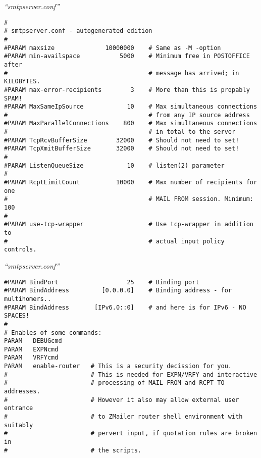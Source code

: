 \documentclass[a4paper,landscape]{slides}
\begin{document}


\begin{overlay}
\small
\centerline{{\it ``smtpserver.conf''}}
\tiny

\begin{verbatim}
#
# smtpserver.conf - autogenerated edition
#
#PARAM maxsize              10000000    # Same as -M -option
#PARAM min-availspace           5000    # Minimum free in POSTOFFICE after
#                                       # message has arrived; in KILOBYTES.
#PARAM max-error-recipients        3    # More than this is propably SPAM!
#PARAM MaxSameIpSource            10    # Max simultaneous connections
#                                       # from any IP source address
#PARAM MaxParallelConnections    800    # Max simultaneous connections
#                                       # in total to the server
#PARAM TcpRcvBufferSize        32000    # Should not need to set!
#PARAM TcpXmitBufferSize       32000    # Should not need to set!
#
#PARAM ListenQueueSize            10    # listen(2) parameter
#
#PARAM RcptLimitCount          10000    # Max number of recipients for one
#                                       # MAIL FROM session. Minimum: 100
#
#PARAM use-tcp-wrapper                  # Use tcp-wrapper in addition to
#                                       # actual input policy controls.
\end{verbatim}
\end{overlay}
\begin{overlay}
\small
\centerline{{\it ``smtpserver.conf''}}
\tiny
\begin{verbatim}
#PARAM BindPort                   25    # Binding port
#PARAM BindAddress         [0.0.0.0]    # Binding address - for multihomers..
#PARAM BindAddress       [IPv6.0::0]    # and here is for IPv6 - NO SPACES!
#
# Enables of some commands:
PARAM   DEBUGcmd
PARAM   EXPNcmd
PARAM   VRFYcmd
PARAM   enable-router   # This is a security decission for you.
#                       # This is needed for EXPN/VRFY and interactive
#                       # processing of MAIL FROM and RCPT TO addresses.
#                       # However it also may allow external user entrance
#                       # to ZMailer router shell environment with suitably
#                       # pervert input, if quotation rules are broken in
#                       # the scripts.
\end{verbatim}
\end{overlay}
\end{document}
